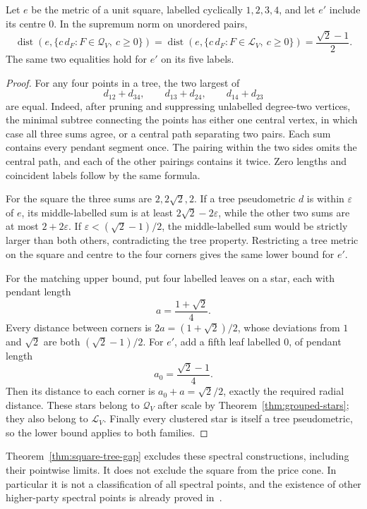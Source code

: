 \begin{theorem}
\label{thm:square-tree-gap}
Let $e$ be the metric of a unit square, labelled cyclically $1,2,3,4$, and let $e'$ include its centre $0$.  In the supremum norm on unordered pairs,
\[
 \operatorname{dist}(e,\{c\,d_F:F\in\mathcal Q_V,\ c\geq0\})
 =\operatorname{dist}(e,\{c\,d_F:F\in\mathcal L_V,\ c\geq0\})
 =\frac{\sqrt2-1}{2}.
\]
The same two equalities hold for $e'$ on its five labels.
\end{theorem}
\begin{proof}
For any four points in a tree, the two largest of
\[
 d_{12}+d_{34},\qquad d_{13}+d_{24},\qquad d_{14}+d_{23}
\]
are equal.  Indeed, after pruning and suppressing unlabelled degree-two vertices, the minimal subtree connecting the points has either one central vertex, in which case all three sums agree, or a central path separating two pairs.  Each sum contains every pendant segment once.  The pairing within the two sides omits the central path, and each of the other pairings contains it twice.  Zero lengths and coincident labels follow by the same formula.

For the square the three sums are $2,2\sqrt2,2$.  If a tree pseudometric $d$ is within $\varepsilon$ of $e$, its middle-labelled sum is at least $2\sqrt2-2\varepsilon$, while the other two sums are at most $2+2\varepsilon$.  If $\varepsilon<(\sqrt2-1)/2$, the middle-labelled sum would be strictly larger than both others, contradicting the tree property.  Restricting a tree metric on the square and centre to the four corners gives the same lower bound for $e'$.

For the matching upper bound, put four labelled leaves on a star, each with pendant length
\[
 a=\frac{1+\sqrt2}{4}.
\]
Every distance between corners is $2a=(1+\sqrt2)/2$, whose deviations from $1$ and $\sqrt2$ are both $(\sqrt2-1)/2$.  For $e'$, add a fifth leaf labelled $0$, of pendant length
\[
 a_0=\frac{\sqrt2-1}{4}.
\]
Then its distance to each corner is $a_0+a=\sqrt2/2$, exactly the required radial distance.  These stars belong to $\mathcal Q_V$ after scale by Theorem~\ref{thm:grouped-stars}; they also belong to $\mathcal L_V$.  Finally every clustered star is itself a tree pseudometric, so the lower bound applies to both families.
\end{proof}

Theorem~\ref{thm:square-tree-gap} excludes these spectral constructions, including their pointwise limits.  It does not exclude the square from the price cone.  In particular it is not a classification of all spectral points, and the existence of other higher-party spectral points is already proved in~\cite{alp-edge,bcfln-quantum}.

